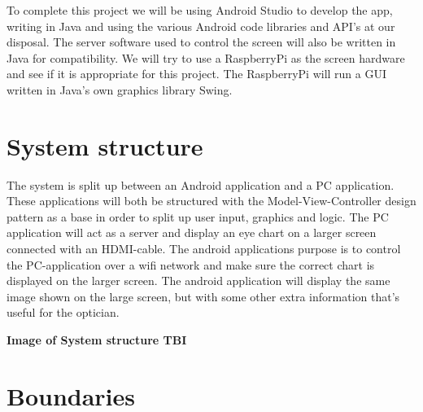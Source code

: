 \documentclass[12pt,a4paper,notitlepage]{report}
\begin{document}
To complete this project we will be using Android Studio to develop the app, writing in Java and using the various Android code libraries and API's at our disposal. The server software used to control the screen will also be written in Java for compatibility. We will try to use a RaspberryPi as the screen hardware and see if it is appropriate for this project. The RaspberryPi will run a GUI written in Java's own graphics library Swing. 


\section{System structure}

The system is split up between an Android application and a PC application. These applications will both be structured with the Model-View-Controller design pattern as a base in order to split up user input, graphics and logic. The PC application will act as a server and display an eye chart on a larger screen connected with an HDMI-cable. The android applications purpose is to control the PC-application over a wifi network and make sure the correct chart is displayed on the larger screen. The android application will display the same image shown on the large screen, but with some other extra information that's useful for the optician.

\textbf{Image of System structure TBI}



\section{Boundaries}
\end{document}
